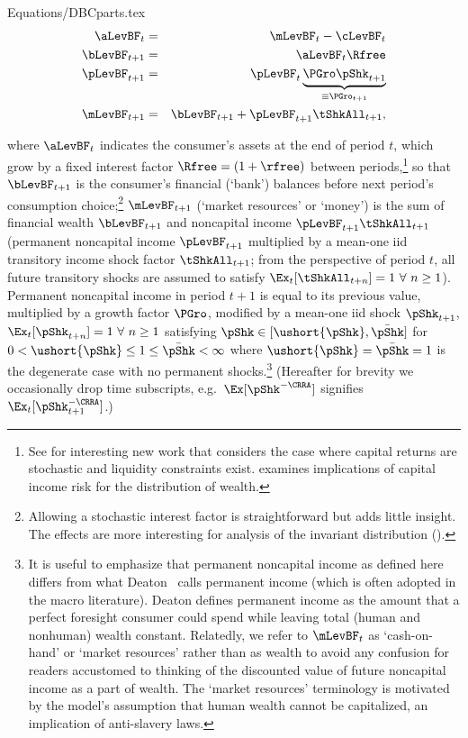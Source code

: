 \documentclass[titlepage]{\econtex}\providecommand{\texname}{BufferStockTheory}%
\providecommand{\EqDir}{Equations}
\begin{document}
\begin{verbatimwrite}{\EqDir/DBCparts.tex}
\begin{eqnarray}
\aLevBF_{t}   &=&\mLevBF_{t}-\cLevBF_{t}  \label{eq:DBCparts} \\
\bLevBF_{t+1}   & = & \aLevBF_{t} \Rfree \notag \\
\pLevBF_{t+1} &=&\pLevBF_{t} \underbrace{\PGro\pShk_{t+1}}_{\equiv \PGro_{t+1}}  \notag \\
%
\mLevBF_{t+1} &=& \bLevBF_{t+1} +\pLevBF_{t+1}\tShkAll_{t+1},  \notag
\end{eqnarray}
\end{verbatimwrite}
 where $\aLevBF_{t}$ indicates the consumer's assets at the end of period $t$, which grow by a fixed interest factor $\Rfree =(1+\rfree)$ between periods,\footnote{See \cite{mstCapIncFluct} for interesting new work that considers the case where capital returns are stochastic and liquidity constraints exist.  \cite{benhabibWealth} examines implications of capital income risk for the distribution of wealth.}  so that $\bLevBF_{t+1}$ is the consumer's financial (`bank') balances before next period's consumption choice;\footnote{Allowing a stochastic interest factor is straightforward but adds little insight.  The effects are more interesting for analysis of the invariant distribution (\cite{szeidlInvariant}).} $\mLevBF_{t+1}$ (`market resources' or `money') is the sum of financial wealth $\bLevBF_{t+1}$ and noncapital income $\pLevBF_{t+1}\tShkAll_{t+1}$ (permanent noncapital income $\pLevBF_{t+1}$ multiplied by a mean-one iid transitory income shock factor $\tShkAll_{t+1}$; from the perspective of period $t$, all future transitory shocks are assumed to satisfy $\Ex_{t}[{\tShkAll}_{t+n}]=1~\forall~n\geq 1$). Permanent noncapital income in period $t+1$ is equal to its previous value, multiplied by a growth factor $\PGro$, modified by a mean-one iid shock $\pShk_{t+1}$, $\Ex_{t}[{\pShk}_{t+n}]=1~\forall~n \geq 1$ satisfying $\pShk \in [\ushort{\pShk},\bar{\pShk}]$ for $0 < \ushort{\pShk} \leq 1 \leq \bar{\pShk} < \infty$ where $\ushort{\pShk}=\bar{\pShk}=1$ is the degenerate case with no permanent shocks.\footnote{It is useful to emphasize that permanent noncapital income as defined here differs from what Deaton~\citeyearpar{deatonUnderstandingC} calls permanent income (which is often adopted in the macro literature).  Deaton defines permanent income as the amount that a perfect foresight consumer could spend while leaving total (human and nonhuman) wealth constant.  Relatedly, we refer to $\mLevBF_{t}$ as `cash-on-hand' or `market resources' rather than as wealth to avoid any confusion for readers accustomed to thinking of the discounted value of future noncapital income as a part of wealth.  The `market resources' terminology is motivated by the model's assumption that human wealth cannot be capitalized, an implication of anti-slavery laws.}  (Hereafter for brevity we occasionally drop time subscripts, e.g.\ $\Ex[\pShk^{-\CRRA}]$ signifies $\Ex_{t}[\pShk_{t+1}^{-\CRRA}]$.)
\end{document}
